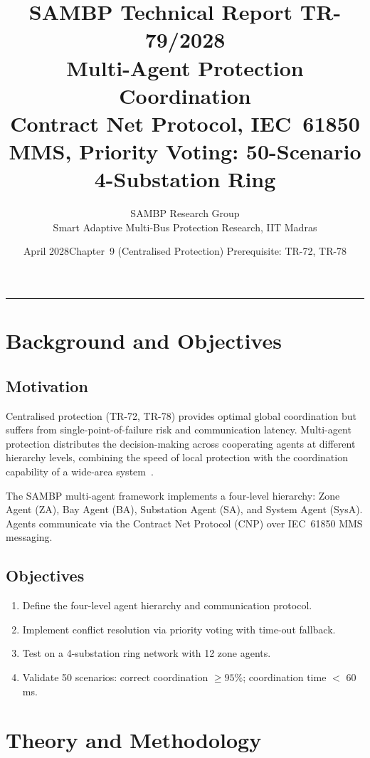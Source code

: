 \documentclass[11pt, a4paper]{article}
\title{\textbf{\textsf{\color{sambpblue}SAMBP Technical Report TR-79/2028}}\\[6pt]
  \Large Multi-Agent Protection Coordination\\[4pt]
  \normalsize Contract Net Protocol, IEC~61850 MMS,
  Priority Voting: 50-Scenario 4-Substation Ring}
\author{SAMBP Research Group\\[2pt]
  \small Smart Adaptive Multi-Bus Protection Research, IIT Madras}
\date{April 2028\quad\textbar\quad Chapter~9 (Centralised Protection)\quad\textbar\quad
  Prerequisite: TR-72, TR-78}
\begin{document}
\maketitle
\tableofcontents
\vspace{6pt}\hrule\vspace{10pt}

\section{Background and Objectives}
\label{sec:background}

\subsection{Motivation}

Centralised protection (TR-72, TR-78) provides optimal global coordination
but suffers from single-point-of-failure risk and communication latency.
Multi-agent protection distributes the decision-making across cooperating
agents at different hierarchy levels, combining the speed of local protection
with the coordination capability of a wide-area system~\cite{Paber2018}.

The SAMBP multi-agent framework implements a four-level hierarchy:
Zone Agent (ZA), Bay Agent (BA), Substation Agent (SA), and System Agent
(SysA). Agents communicate via the Contract Net Protocol (CNP) over
IEC~61850 MMS messaging.

\subsection{Objectives}

\begin{enumerate}
  \item Define the four-level agent hierarchy and communication protocol.
  \item Implement conflict resolution via priority voting with time-out fallback.
  \item Test on a 4-substation ring network with 12 zone agents.
  \item Validate 50 scenarios: correct coordination $\geq 95\%$;
    coordination time $<$ 60\,ms.
\end{enumerate}

\section{Theory and Methodology}
\label{sec:theory}
\end{document}
